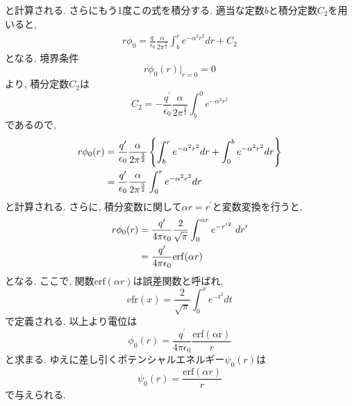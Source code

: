 と計算される. さらにもう1度この式を積分する. 適当な定数$b$と積分定数$C_{2}$を用いると,
\begin{align}
   r \phi_{0}
 =
   \frac{q^{\prime}}{\epsilon_{0}} \frac{\alpha}{2 \pi^{\frac{3}{2}}}
   \int_{b}^{r} e^{- \alpha^{2} r^{2}} dr + C_{2}
 \label{eq:Ewald18}
\end{align}
となる. 境界条件
\begin{equation}
 r \phi_{0}(r) |_{r=0} = 0
 \label{eq:Ewald19}
\end{equation}
より, 積分定数$C_{2}$は
\begin{equation}
    C_{2}
  =
    -\frac{q^{\prime}}{\epsilon_{0}} \frac{\alpha}{2 \pi^{\frac{3}{2}}}
     \int_{b}^{0} e^{- \alpha^{2} r^{2}}
 \label{eq:Ewald20}
\end{equation}
であるので,
\begin{align}
    r \phi_{0}(r)
 &=
    \frac{q^{\prime}}{\epsilon_{0}} \frac{\alpha}{2 \pi^{\frac{3}{2}}}
    \left\{
            \int_{b}^{r} e^{- \alpha^{2} r^{2}} dr
           +\int_{0}^{b} e^{- \alpha^{2} r^{2}} dr
    \right\}
 \notag
 \\
 &=
    \frac{q^{\prime}}{\epsilon_{0}} \frac{\alpha}{2 \pi^{\frac{3}{2}}}
    \int_{0}^{r} e^{- \alpha^{2} r^{2}} dr
 \label{eq:Ewald21}
\end{align}
と計算される. さらに, 積分変数に関して$\alpha r = r^{'}$と変数変換を行うと,
\begin{align}
    r \phi_{0}(r)
 &=
    \frac{q^{\prime}}{4 \pi \epsilon_{0}}
    \frac{2}{\sqrt{\pi}} \int_{0}^{\alpha r} e^{- {r^{\prime}}^{2}} ~dr^{\prime}
 \notag
 \\
 &=
    \frac{q^{\prime}}{4 \pi \epsilon_{0}} \mathrm{erf} (\alpha r)
 \label{eq:Ewald22}
\end{align}
となる. ここで, 関数$\mathrm{erf}(\alpha r)$は誤差関数と呼ばれ,
\begin{equation}
 \mathrm{efr}(x) = \frac{2}{\sqrt{\pi}} \int_{0}^{x} e^{- t^{2}} dt
 \label{eq:Ewald23}
\end{equation}
で定義される. 以上より電位は
\begin{equation}
 \phi_{0}(r) = \frac{q^{\prime}}{4 \pi \epsilon_{0}} \frac{\mathrm{erf(\alpha r)}}{r}
 \label{eq:Ewald24}
\end{equation}
と求まる. ゆえに差し引くポテンシャルエネルギー$\psi_{0}(r)$は
\begin{equation}
 \psi_{0}(r) = \frac{\mathrm{erf}( \alpha r)}{r}
 \label{eq:Ewald25}
\end{equation}
で与えられる.

